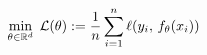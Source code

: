 \documentclass[preview]{standalone}
\begin{document}
\begin{align*}
\special{dvisvgm:raw <g id='unique000'>}\min_{\theta\in\mathbb{R}^d}\;\mathcal{L}(\theta):=\frac{1}{n}\sum_{i=1}^n\ell(y_i,\,f_\theta(x_i))\special{dvisvgm:raw </g>}
\end{align*}
\end{document}
